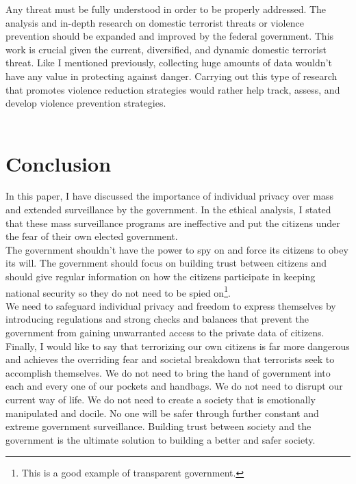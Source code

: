 \documentclass[11pt]{report}
\begin{document}
Any threat must be fully understood in order to be properly addressed. The analysis and in-depth research on domestic terrorist threats or violence prevention should be expanded and improved by the federal government. This work is crucial given the current, diversified, and dynamic domestic terrorist threat. Like I mentioned previously, collecting huge amounts of data wouldn't have any value in protecting against danger. Carrying out this type of research that promotes violence reduction strategies would rather help track, assess, and develop violence prevention strategies.\\ 

\\

\section*{Conclusion}

In this paper, I have discussed the importance of individual privacy over mass and extended surveillance by the government. In the ethical analysis, I stated that these mass surveillance programs are ineffective and put the citizens under the fear of their own elected government.\\ 

The government shouldn't have the power to spy on and force its citizens to obey its will. The government should focus on building trust between citizens and should give regular information on how the citizens participate in keeping national security so they do not need to be spied on\footnote{This is a good example of transparent government.}.\\

We need to safeguard individual privacy and freedom to express themselves by introducing regulations and strong checks and balances that prevent the government from gaining unwarranted access to the private data of citizens. \\

Finally, I would like to say that terrorizing our own citizens is far more dangerous and achieves the overriding fear and societal breakdown that terrorists seek to accomplish themselves. We do not need to bring the hand of government into each and every one of our pockets and handbags. We do not need to disrupt our current way of life. We do not need to create a society that is emotionally manipulated and docile. No one will be safer through further constant and extreme government surveillance. Building trust between society and the government is the ultimate solution to building a better and safer society.
 
\newpage
\printbibliography
\end{document}
